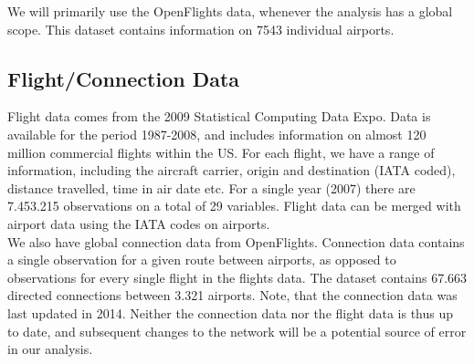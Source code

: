We will primarily use the OpenFlights data, whenever the analysis has a global scope. This dataset contains information on 7543 individual airports.

\subsection{Flight/Connection Data}
\label{subsec:Flight_Data}
Flight data comes from the 2009 Statistical Computing Data Expo. Data is available for the period 1987-2008, and  includes information on almost 120 million commercial flights within the US. For each flight, we have a range of information, including the aircraft carrier, origin and destination (IATA coded), distance travelled, time in air date etc. For a single year (2007) there are 7.453.215 observations on a total of 29 variables. Flight data can be merged with airport data using the IATA codes on airports. \medskip\\
We also have global connection data from OpenFlights. Connection data contains a single observation for a given route between airports, as opposed to observations for every single flight in the flights data. The dataset contains 67.663 directed connections between 3.321 airports. Note, that the connection data was last updated in 2014. Neither the connection data nor the flight data is thus up to date, and subsequent changes to the network will be a potential source of error in our analysis.


